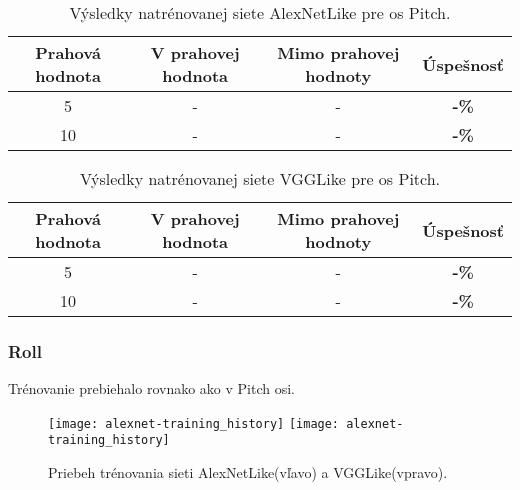 \begin{table}[H]
    \centering
    \begin{tabular}{|c|c|c|c|}
        \hline
        Prahová hodnota & V prahovej hodnota       & Mimo prahovej hodnoty    & Úspešnosť    \\ \hline
        5               & {\color[HTML]{009901} -} & {\color[HTML]{9A0000} -} & \textbf{-\%} \\ \hline
        10              & {\color[HTML]{009901} -} & {\color[HTML]{9A0000} -} & \textbf{-\%} \\ \hline
    \end{tabular}
    \caption{Výsledky natrénovanej siete AlexNetLike pre os Pitch.}
    \label{tab:alexnetpitchresults}
\end{table}
\begin{table}[H]
    \centering
    \begin{tabular}{|c|c|c|c|}
        \hline
        Prahová hodnota & V prahovej hodnota       & Mimo prahovej hodnoty    & Úspešnosť    \\ \hline
        5               & {\color[HTML]{009901} -} & {\color[HTML]{9A0000} -} & \textbf{-\%} \\ \hline
        10              & {\color[HTML]{009901} -} & {\color[HTML]{9A0000} -} & \textbf{-\%} \\ \hline
    \end{tabular}
    \caption{Výsledky natrénovanej siete VGGLike pre os Pitch.}
    \label{tab:vgglikepitchresults}
\end{table}


\subsubsection{Roll}
Trénovanie prebiehalo rovnako ako v Pitch osi.

\begin{figure}[H]
    \centering
    \texttt{[image: alexnet-training\_history]} %
	\texttt{[image: alexnet-training\_history]} %
	\caption{Priebeh trénovania sieti AlexNetLike(vľavo) a VGGLike(vpravo).}
	\label{pic:rollaxis}
\end{figure}

